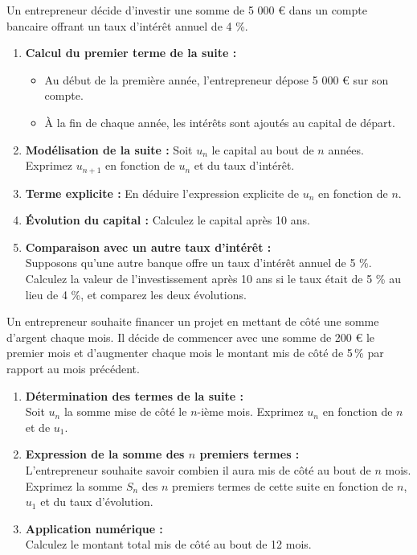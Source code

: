\documentclass[11pt]{article}
\begin{document}
\begin{exercice}
Un entrepreneur décide d'investir une somme de 5 000 € dans un compte bancaire offrant un taux d'intérêt annuel de 4 \%.

\begin{enumerate}
    \item \textbf{Calcul du premier terme de la suite :}
    \begin{itemize}
        \item Au début de la première année, l'entrepreneur dépose 5 000 € sur son compte.
        \item À la fin de chaque année, les intérêts sont ajoutés au capital de départ.
    \end{itemize}

    \item \textbf{Modélisation de la suite :} Soit $u_n$ le capital au bout de $n$ années. Exprimez $u_{n+1}$ en fonction de $u_n$ et du taux d'intérêt. 
    \item \textbf{Terme explicite :} En déduire l'expression explicite de $u_n$ en fonction de $n$.
    \item \textbf{Évolution du capital :} Calculez le capital après 10
      ans.
    \item \textbf{Comparaison avec un autre taux d’intérêt :} \\
    Supposons qu'une autre banque offre un taux d’intérêt annuel de 5 \%.
    Calculez la valeur de l’investissement après 10 ans si le taux était de 5 \% au lieu de 4 \%, et comparez les deux évolutions.
\end{enumerate}
\end{exercice}

\begin{exercice}
Un entrepreneur souhaite financer un projet en mettant de côté une somme d'argent chaque mois. Il décide de commencer avec une somme de 200 € le premier mois et d'augmenter chaque mois le montant mis de côté de 5\,\% par rapport au mois précédent.

\begin{enumerate}
    \item \textbf{Détermination des termes de la suite :} \\
    Soit \( u_n \) la somme mise de côté le \( n \)-ième mois. Exprimez \( u_n \) en fonction de \( n \) et de \( u_1 \).
    
    \item \textbf{Expression de la somme des \( n \) premiers termes :} \\
    L'entrepreneur souhaite savoir combien il aura mis de côté au bout de \( n \) mois. Exprimez la somme \( S_n \) des \( n \) premiers termes de cette suite en fonction de \( n \), \( u_1 \) et du taux d’évolution.
    
    \item \textbf{Application numérique :} \\
    Calculez le montant total mis de côté au bout de 12 mois.
\end{enumerate}
\end{exercice}
\end{document}
